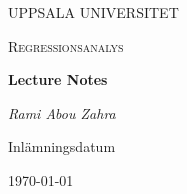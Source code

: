 \begin{titlepage}

  \centering
	{\scshape\LARGE UPPSALA UNIVERSITET\par}
	\vspace{1cm}
  {\scshape\Large {Regressionsanalys} \par}
	\vspace{1.5cm}
  {\huge\bfseries {Lecture Notes} \par}
	\vspace{2cm}
	{\Large\itshape Rami Abou Zahra \par}
	\vfill
  \vfill


  {\large Inlämningsdatum}\par
  {\today}

\end{titlepage}

